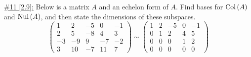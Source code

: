\documentclass{exam}
\begin{document}
\underline{\#11 [2.9]:} Below is a matrix $A$ and an echelon form of $A$. Find bases for $\text{Col}\left(A\right)$ and $\text{Nul}\left(A\right)$, and then state the dimensions of these subspaces.
\[
    \begin{pmatrix}
        1 & 2 & -5 & 0 & -1 \\
        2 & 5 & -8 & 4 & 3 \\
        -3 & -9 & 9 & -7 & -2 \\
        3 & 10 & -7 & 11 & 7
    \end{pmatrix}
    \sim
    \begin{pmatrix}
        1 & 2 & -5 & 0 & -1 \\
        0 & 1 & 2 & 4 & 5 \\
        0 & 0 & 0 & 1 & 2 \\
        0 & 0 & 0 & 0 & 0
    \end{pmatrix}
\]
\end{document}
